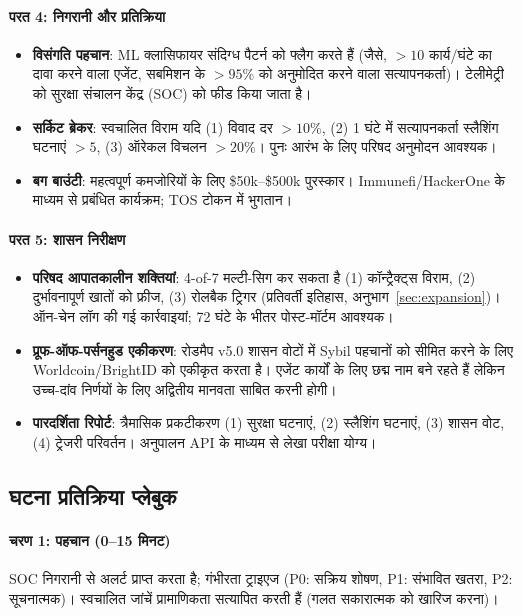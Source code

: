 \documentclass[11pt]{article}
\begin{document}
\begin{itemize}[noitemsep]
\begin{itemize}[noitemsep]
\begin{itemize}[noitemsep]
\begin{itemize}[noitemsep]
\begin{itemize}[noitemsep]
\paragraph{परत 4: निगरानी और प्रतिक्रिया}
\begin{itemize}[noitemsep]
  \item \textbf{विसंगति पहचान}: ML क्लासिफायर संदिग्ध पैटर्न को फ्लैग करते हैं (जैसे, $>10$ कार्य/घंटे का दावा करने वाला एजेंट, सबमिशन के $>95\%$ को अनुमोदित करने वाला सत्यापनकर्ता)। टेलीमेट्री को सुरक्षा संचालन केंद्र (SOC) को फीड किया जाता है।
  \item \textbf{सर्किट ब्रेकर}: स्वचालित विराम यदि (1) विवाद दर $>10\%$, (2) 1 घंटे में सत्यापनकर्ता स्लैशिंग घटनाएं $>5$, (3) ऑरेकल विचलन $>20\%$। पुनः आरंभ के लिए परिषद अनुमोदन आवश्यक।
  \item \textbf{बग बाउंटी}: महत्वपूर्ण कमजोरियों के लिए \$50k--\$500k पुरस्कार। Immunefi/HackerOne के माध्यम से प्रबंधित कार्यक्रम; TOS टोकन में भुगतान।
\end{itemize}

\paragraph{परत 5: शासन निरीक्षण}
\begin{itemize}[noitemsep]
  \item \textbf{परिषद आपातकालीन शक्तियां}: 4-of-7 मल्टी-सिग कर सकता है (1) कॉन्ट्रैक्ट्स विराम, (2) दुर्भावनापूर्ण खातों को फ्रीज, (3) रोलबैक ट्रिगर (प्रतिवर्ती इतिहास, अनुभाग~\ref{sec:expansion})। ऑन-चेन लॉग की गई कार्रवाइयां; 72 घंटे के भीतर पोस्ट-मॉर्टम आवश्यक।
  \item \textbf{प्रूफ-ऑफ-पर्सनहुड एकीकरण}: रोडमैप v5.0 शासन वोटों में Sybil पहचानों को सीमित करने के लिए Worldcoin/BrightID को एकीकृत करता है। एजेंट कार्यों के लिए छद्म नाम बने रहते हैं लेकिन उच्च-दांव निर्णयों के लिए अद्वितीय मानवता साबित करनी होगी।
  \item \textbf{पारदर्शिता रिपोर्ट}: त्रैमासिक प्रकटीकरण (1) सुरक्षा घटनाएं, (2) स्लैशिंग घटनाएं, (3) शासन वोट, (4) ट्रेजरी परिवर्तन। अनुपालन API के माध्यम से लेखा परीक्षा योग्य।
\end{itemize}

\subsection{घटना प्रतिक्रिया प्लेबुक}

\paragraph{चरण 1: पहचान (0--15 मिनट)}
SOC निगरानी से अलर्ट प्राप्त करता है; गंभीरता ट्राइएज (P0: सक्रिय शोषण, P1: संभावित खतरा, P2: सूचनात्मक)। स्वचालित जांचें प्रामाणिकता सत्यापित करती हैं (गलत सकारात्मक को खारिज करना)।


\end{itemize}
\end{itemize}
\end{itemize}
\end{itemize}
\end{itemize}
\end{document}
